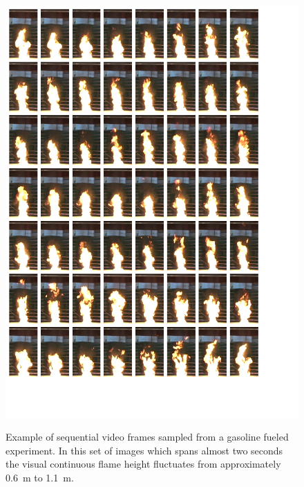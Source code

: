 \documentclass[twoside]{uocthesis}
\begin{document}
{{\begin{figure}
	\centering
	\includegraphics[width=\textwidth]{../Figures/flame_height_comp_FHGAS}\\
	\caption[Example of sequential video frames sampled from a gasoline fueled experiment]{Example of sequential video frames sampled from a gasoline fueled experiment.  In this set of images which spans almost two seconds the visual continuous flame height fluctuates from approximately 0.6~m to 1.1~m.}
	\label{flame_height_comp_FHGAS_1}
\end{figure}

}}
\end{document}
